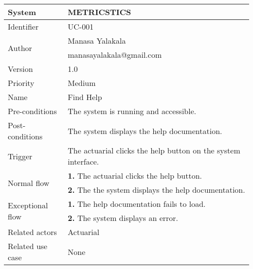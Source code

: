 \begin{table}[htb]
    \centering
    \begin{tabular}{|p{4cm}|p{12cm}|} \hline 
         System &  METRICSTICS\\ \hline 
         
         Identifier & UC-001 \\ \hline 
         
         \multirow{2}{*}{Author} & Manasa Yalakala  \\
         &manasayalakala@gmail.com \\
           \hline 
           Version & 1.0\\ \hline
         
         Priority &  Medium\\ \hline 
         
         Name & Find Help \\ \hline 
         Pre-conditions & The system is running and accessible. \\ \hline 
         Post-conditions &  The system displays the help documentation. \\ \hline
         Trigger & The actuarial clicks the help button on the system interface. \\ \hline
        \multirow{2}{*}{Normal flow} 
        & \textbf{1.} The actuarial clicks the help button. \\ 
        & \textbf{2.} The the system displays the help documentation. \\  
        
        \hline
         \multirow{2}{*}{Exceptional flow} 
        & \textbf{1.} The help documentation fails to load. \\ 
        & \textbf{2.} The system displays an error. \\ 
        \hline
         Related actors & Actuarial  \\ \hline
        Related use case & None \\ \hline
         
    \end{tabular}
    \caption{}
    \label{tab:my_label}
\end{table}


